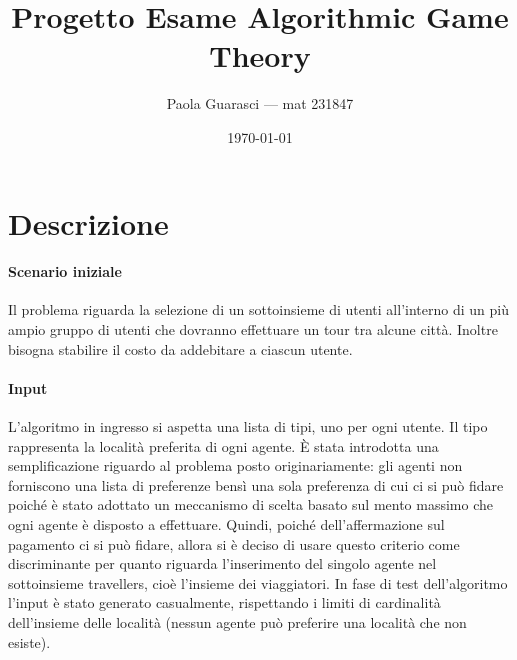 \documentclass{article}
\title{Progetto Esame Algorithmic Game Theory}
\author{Paola Guarasci --- mat 231847}
\date{\today}
\begin{document}
\maketitle


\section*{Descrizione}
\paragraph*{Scenario iniziale}
Il problema riguarda la selezione di un sottoinsieme di utenti all'interno di un più ampio gruppo di utenti che dovranno effettuare un tour tra alcune città. Inoltre bisogna stabilire il costo da addebitare a ciascun utente.
\paragraph*{Input}
L'algoritmo in ingresso si aspetta una lista di tipi, uno per ogni utente. Il tipo rappresenta la località preferita di ogni agente. È stata introdotta una semplificazione riguardo al problema posto originariamente: gli agenti non forniscono una lista di preferenze bensì una sola preferenza di cui ci si può fidare poiché è stato adottato un meccanismo di scelta basato sul mento massimo che ogni agente è disposto a effettuare. Quindi, poiché dell'affermazione sul pagamento ci si può fidare, allora si è deciso di usare questo criterio come discriminante per quanto riguarda l'inserimento del singolo agente nel sottoinsieme travellers, cioè l'insieme dei viaggiatori.
In fase di test dell'algoritmo l'input è stato generato casualmente, rispettando i limiti di cardinalità dell'insieme delle località (nessun agente può preferire una località che non esiste).
\end{document}
